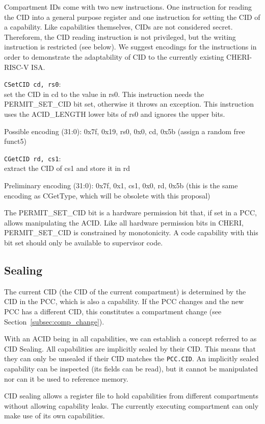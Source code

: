 Compartment IDs come with two new instructions.
One instruction for reading the CID into a general purpose register and one instruction for setting the CID of a capability.
Like capabilities themselves, CIDs are not considered secret.
Thereforem, the CID reading instruction is not privileged, but the writing instruction is restricted (see below).
We suggest encodings for the instructions in order to demonstrate the adaptability of CID to the currently existing CHERI-RISC-V ISA.

\texttt{CSetCID cd, rs0}:\\
set the CID in cd to the value in rs0.
This instruction needs the PERMIT\_SET\_CID bit set, otherwise it throws an exception.
This instruction uses the ACID\_LENGTH lower bits of rs0 and ignores the upper bits.

Possible encoding (31:0): 0x7f, 0x19, rs0, 0x0, cd, 0x5b (assign a random free funct5)

\texttt{CGetCID rd, cs1}:\\
extract the CID of cs1 and store it in rd

Preliminary encoding (31:0): 0x7f, 0x1, cs1, 0x0, rd, 0x5b (this is the same encoding as CGetType, which will be obsolete with this proposal)

The PERMIT\_SET\_CID bit is a hardware permission bit that, if set in a PCC, allows manipulating the ACID.
Like all hardware permission bits in CHERI, PERMIT\_SET\_CID is constrained by monotonicity.
A code capability with this bit set should only be available to supervisor code.


\subsection{Sealing}

The current CID (the CID of the current compartment) is determined by the CID in the PCC, which is also a capability.
If the PCC changes and the new PCC has a different CID, this constitutes a compartment change (see Section~\ref{subsec:comp_change}).

With an ACID being in all capabilities, we can establish a concept referred to as CID Sealing.
All capabilities are implicitly sealed by their CID.
This means that they can only be unsealed if their CID matches the \texttt{PCC.CID}.
An implicitly sealed capability can be inspected (its fields can be read), but it cannot be manipulated nor can it be used to reference memory.

CID sealing allows a register file to hold capabilities from different compartments without allowing capability leaks.
The currently executing compartment can only make use of its own capabilities.


